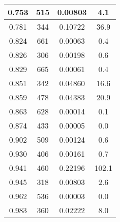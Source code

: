 \begin{longtable}{c | c | c | c}
0.753 &  515 & 0.00803 &  4.1 \\ \hline 
0.781 &  344 & 0.10722 & 36.9 \\ \hline 
0.824 &  661 & 0.00063 &  0.4 \\ \hline 
0.826 &  306 & 0.00198 &  0.6 \\ \hline 
0.829 &  665 & 0.00061 &  0.4 \\ \hline 
0.851 &  342 & 0.04860 & 16.6 \\ \hline 
0.859 &  478 & 0.04383 & 20.9 \\ \hline 
0.863 &  628 & 0.00014 &  0.1 \\ \hline 
0.874 &  433 & 0.00005 &  0.0 \\ \hline 
0.902 &  509 & 0.00124 &  0.6 \\ \hline 
0.930 &  406 & 0.00161 &  0.7 \\ \hline 
0.941 &  460 & 0.22196 & 102.1 \\ \hline 
0.945 &  318 & 0.00803 &  2.6 \\ \hline 
0.962 &  536 & 0.00003 &  0.0 \\ \hline 
0.983 &  360 & 0.02222 &  8.0 \\ \hline 
\end{longtable}